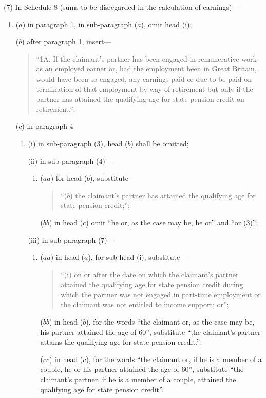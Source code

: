 \documentclass[12pt,a4paper]{article}
\begin{document}
(7) In Schedule 8 (sums to be disregarded in the calculation of earnings)—
\begin{enumerate}\item[]
($a$) in paragraph 1, in sub-paragraph ($a$), omit head (i);

($b$) after paragraph 1, insert—
\begin{quotation}
“1A.  If the claimant’s partner has been engaged in remunerative work as an employed earner or, had the employment been in Great Britain, would have been so engaged, any earnings paid or due to be paid on termination of that employment by way of retirement but only if the partner has attained the qualifying age for state pension credit on retirement.”;
\end{quotation}

($c$) in paragraph 4—
\begin{enumerate}\item[]
(i) in sub-paragraph (3), head ($b$)  shall be omitted;

(ii) in sub-paragraph (4)—
\begin{enumerate}\item[]
($aa$) for head ($b$), substitute—
\begin{quotation}
“($b$) the claimant’s partner has attained the qualifying age for state pension credit;”;
\end{quotation}

($bb$) in head ($c$)  omit “he or, as the case may be, he or” and “or (3)”;
\end{enumerate}

(iii) in sub-paragraph (7)—
\begin{enumerate}\item[]
($aa$) in head ($a$), for sub-head (i), substitute—
\begin{quotation}
“(i) on or after the date on which the claimant’s partner attained the qualifying age for state pension credit during which the partner was not engaged in part-time employment or the claimant was not entitled to income support; or”;
\end{quotation}

($bb$) in head ($b$), for the words “the claimant or, as the case may be, his partner attained the age of 60”, substitute “the claimant’s partner attains the qualifying age for state pension credit.”;

($cc$) in head ($c$), for the words “the claimant or, if he is a member of a couple, he or his partner attained the age of 60”, substitute “the claimant’s partner, if he is a member of a couple, attained the qualifying age for state pension credit”.
\end{enumerate}
\end{enumerate}
\end{enumerate}
\end{document}
